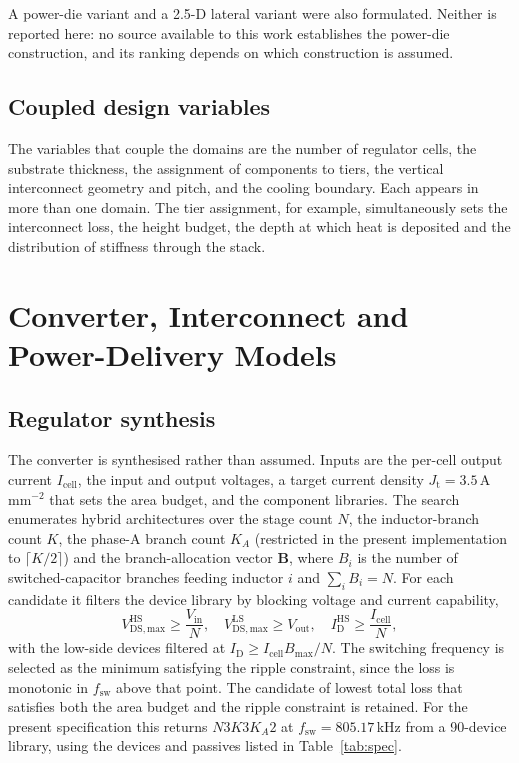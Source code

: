\documentclass[journal]{IEEEtran}
\begin{document}
A power-die variant and a 2.5-D lateral variant were also formulated. Neither is reported
here: no source available to this work establishes the power-die construction, and its
ranking depends on which construction is assumed.

\subsection{Coupled design variables}
The variables that couple the domains are the number of regulator cells, the substrate
thickness, the assignment of components to tiers, the vertical interconnect geometry and
pitch, and the cooling boundary. Each appears in more than one domain. The tier assignment,
for example, simultaneously sets the interconnect loss, the height budget, the depth at which
heat is deposited and the distribution of stiffness through the stack.

\section{Converter, Interconnect and Power-Delivery Models}\label{sec:elec}

\subsection{Regulator synthesis}
The converter is synthesised rather than assumed. Inputs are the per-cell output current
$I_{\mathrm{cell}}$, the input and output voltages, a target current density
$J_{\mathrm{t}} = 3.5$\,A\,mm$^{-2}$ that sets the area budget, and the component libraries.
The search enumerates hybrid architectures over the stage count $N$, the inductor-branch
count $K$, the phase-A branch count $K_{A}$ (restricted in the present implementation to
$\lceil K/2 \rceil$) and the branch-allocation vector $\mathbf{B}$, where $B_i$ is the number
of switched-capacitor branches feeding inductor $i$ and $\sum_i B_i = N$. For each
candidate it filters the device library by blocking voltage and current capability,
\begin{equation}
V_{\mathrm{DS,max}}^{\mathrm{HS}} \ge \frac{V_{\mathrm{in}}}{N}, \quad
V_{\mathrm{DS,max}}^{\mathrm{LS}} \ge V_{\mathrm{out}}, \quad
I_{\mathrm{D}}^{\mathrm{HS}} \ge \frac{I_{\mathrm{cell}}}{N},
\label{eq:filter}
\end{equation}
with the low-side devices filtered at $I_{\mathrm{D}} \ge I_{\mathrm{cell}}B_{\max}/N$. The
switching frequency is selected as the minimum satisfying the ripple constraint, since the
loss is monotonic in $f_{\mathrm{sw}}$ above that point. The candidate of lowest total loss
that satisfies both the area budget and the ripple constraint is retained. For the present
specification this returns $N3K3K_{A}2$ at $f_{\mathrm{sw}} = 805.17$\,kHz from a 90-device
library, using the devices and passives listed in Table~\ref{tab:spec}.
\end{document}
